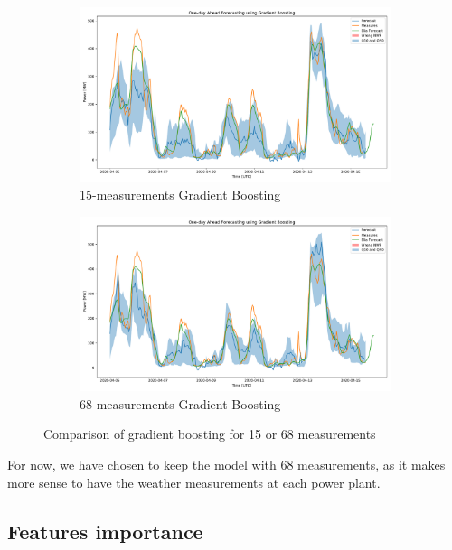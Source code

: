 \documentclass[a4paper, 12pt]{article}
\begin{document}
\begin{figure}[H]
    \begin{subfigure}{1\textwidth}
        \includegraphics[width=\textwidth]{resources/pdf/odaf15_april.pdf}
        \caption{15-measurements Gradient Boosting}
    \end{subfigure}
    
    \vspace{1em}
    
    \begin{subfigure}{1\textwidth}
        \includegraphics[width=\textwidth]{resources/pdf/odaf68_april.pdf}
        \caption{68-measurements Gradient Boosting}
    \end{subfigure}
    \caption{Comparison of gradient boosting for 15 or 68 measurements}
    \label{fig:wind_test_april}
\end{figure}

For now, we have chosen to keep the model with 68 measurements, as it makes more sense to have the weather measurements at each power plant.

\subsection{Features importance}
\end{document}
